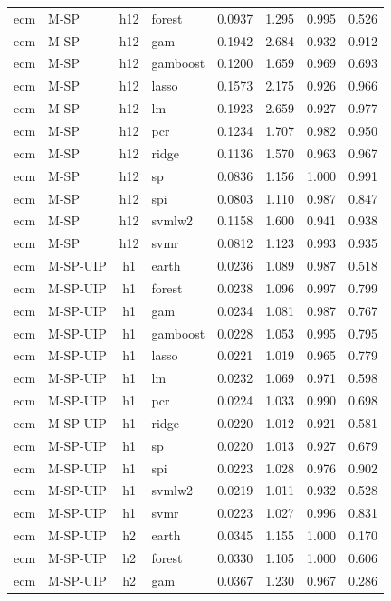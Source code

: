 \begin{ThreePartTable}
\begin{longtable}[t]{llclcccc}
ecm & M-SP & h12 & forest & 0.0937 & 1.295 & 0.995 & 0.526\\
ecm & M-SP & h12 & gam & 0.1942 & 2.684 & 0.932 & 0.912\\
ecm & M-SP & h12 & gamboost & 0.1200 & 1.659 & 0.969 & 0.693\\
ecm & M-SP & h12 & lasso & 0.1573 & 2.175 & 0.926 & 0.966\\
ecm & M-SP & h12 & lm & 0.1923 & 2.659 & 0.927 & 0.977\\
ecm & M-SP & h12 & pcr & 0.1234 & 1.707 & 0.982 & 0.950\\
ecm & M-SP & h12 & ridge & 0.1136 & 1.570 & 0.963 & 0.967\\
ecm & M-SP & h12 & sp & 0.0836 & 1.156 & 1.000 & 0.991\\
ecm & M-SP & h12 & spi & 0.0803 & 1.110 & 0.987 & 0.847\\
ecm & M-SP & h12 & svmlw2 & 0.1158 & 1.600 & 0.941 & 0.938\\
ecm & M-SP & h12 & svmr & 0.0812 & 1.123 & 0.993 & 0.935\\
\addlinespace
ecm & M-SP-UIP & h1 & earth & 0.0236 & 1.089 & 0.987 & 0.518\\
ecm & M-SP-UIP & h1 & forest & 0.0238 & 1.096 & 0.997 & 0.799\\
ecm & M-SP-UIP & h1 & gam & 0.0234 & 1.081 & 0.987 & 0.767\\
ecm & M-SP-UIP & h1 & gamboost & 0.0228 & 1.053 & 0.995 & 0.795\\
ecm & M-SP-UIP & h1 & lasso & 0.0221 & 1.019 & 0.965 & 0.779\\
ecm & M-SP-UIP & h1 & lm & 0.0232 & 1.069 & 0.971 & 0.598\\
ecm & M-SP-UIP & h1 & pcr & 0.0224 & 1.033 & 0.990 & 0.698\\
ecm & M-SP-UIP & h1 & ridge & 0.0220 & 1.012 & 0.921 & 0.581\\
ecm & M-SP-UIP & h1 & sp & 0.0220 & 1.013 & 0.927 & 0.679\\
ecm & M-SP-UIP & h1 & spi & 0.0223 & 1.028 & 0.976 & 0.902\\
ecm & M-SP-UIP & h1 & svmlw2 & 0.0219 & 1.011 & 0.932 & 0.528\\
ecm & M-SP-UIP & h1 & svmr & 0.0223 & 1.027 & 0.996 & 0.831\\
\addlinespace
ecm & M-SP-UIP & h2 & earth & 0.0345 & 1.155 & 1.000 & 0.170\\
ecm & M-SP-UIP & h2 & forest & 0.0330 & 1.105 & 1.000 & 0.606\\
ecm & M-SP-UIP & h2 & gam & 0.0367 & 1.230 & 0.967 & 0.286\\

\end{longtable}
\end{ThreePartTable}
